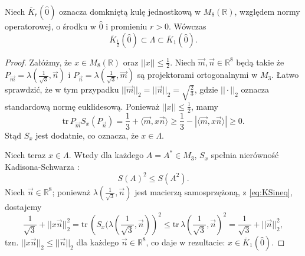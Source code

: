 \begin{Theorem}
\label{thm:LambdaAndBalls}
    Niech $\overline{K}_{r}(\hat{0})$ oznacza domkniętą kulę jednostkową
w $M_{8}(\mathbb{R})$, względem normy operatorowej,
o środku w $\hat{0}$ i promieniu $r > 0$.
    Wówczas
    \begin{equation}
        \overline{K}_{\frac{1}{2}}(\hat{0})
            \subset \Lambda \subset \overline{K}_{1}(\hat{0}).
    \end{equation}
\end{Theorem}
\begin{proof}
    Załóżmy, że $x \in M_{8}(\mathbb{R})$ oraz $||x|| \leq \frac{1}{2}$.
    Niech $\vec{m}, \vec{n} \in \mathbb{R}^{8}$ będą takie że
    $P_{\vec{m}} = \lambda(\frac{1}{\sqrt{3}}, \vec{n})$ i
    $P_{\vec{n}} = \lambda(\frac{1}{\sqrt{3}}, \vec{m})$
    są projektorami ortogonalnymi w $M_{3}$.
Łatwo sprawdzić, że w tym przypadku
    $|| \vec{m} ||_{2} = || \vec{n} ||_{2} = \sqrt{\frac{2}{3}}$,
gdzie  $|| \cdot||_{2}$ oznacza standardową normę euklidesową.
Ponieważ $||x|| \leq \frac{1}{2}$, mamy
    \begin{equation}
        \text{tr} \, P_{\vec{m}} S_{x}(P_{\vec{n}}) =
        \frac{1}{3} + \langle \vec{m}, x \vec{n} \rangle \geq
        \frac{1}{3} - |\langle \vec{m}, x \vec{n} \rangle| \geq 0.
    \end{equation}
Stąd $S_{x}$ jest dodatnie, co oznacza, że $x \in \Lambda$.

Niech teraz $x \in \Lambda$.
Wtedy dla każdego $A = A^{*} \in M_{3}$, $S_{x}$
spełnia nierówność Kadisona-Schwarza
    \cite{choi1980some}:
    \begin{equation}
     \label{eq:KSineq}
        S(A)^{2} \leq S(A^{2}).
    \end{equation}
Niech $\vec{n} \in \mathbb{R}^{8}$;
ponieważ $\lambda(\frac{1}{\sqrt{3}}, \vec{n})$
jest macierzą samosprzężoną, z \eqref{eq:KSineq}, dostajemy
    \begin{equation}
        \frac{1}{\sqrt{3}} + || x \vec{n} ||_{2}^{2} = \text{tr}\,
        \left ( S_{x}(\lambda(\frac{1}{\sqrt{3}}, \vec{n}) \right)^{2} \leq
        \text{tr}\, \lambda(\frac{1}{\sqrt{3}}, \vec{n})^{2} =
        \frac{1}{\sqrt{3}} + ||\vec{n}||_{2}^{2},
    \end{equation}
tzn. $||x\vec{n}||_{2} \leq ||\vec{n}||_{2}$
dla każdego $\vec{n} \in \mathbb{R}^{8}$,
co daje w rezultacie: $x \in \overline{K}_{1}(\hat{0})$.
\end{proof}

